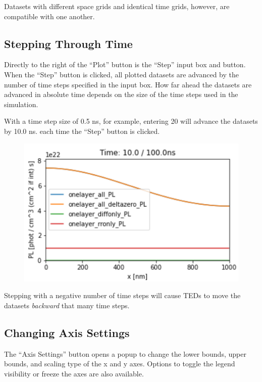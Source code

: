 \documentclass[11pt,letterpaper,titlepage]{article}
\begin{document}
		\par Datasets with different space grids and identical time grids, however, are compatible with one another.
		
		\subsection{Stepping Through Time}
		\par Directly to the right of the “Plot” button is the “Step” input box and button. When the “Step” button is clicked, all plotted datasets are advanced by the number of time steps specified in the input box. How far ahead the datasets are advanced in absolute time depends on the size of the time steps used in the simulation.
		
		\par With a time step size of 0.5 ns, for example, entering 20 will advance the datasets by 10.0 ns. each time the “Step” button is clicked.
		
		\begin{figure}[H]
			\label{fig:step_forward_example}
			\centering
			\includegraphics[scale=1.0]{"step_forward_example"}
		\end{figure}
	
		\par Stepping with a negative number of time steps will cause TEDs to move the datasets \textit{backward} that many time steps.
		
		\subsection {Changing Axis Settings}
		
		\par The “Axis Settings” button opens a popup to change the lower bounds, upper bounds, and scaling type of the x and y axes. Options to toggle the legend visibility or freeze the axes are also available.
		
\end{document}

